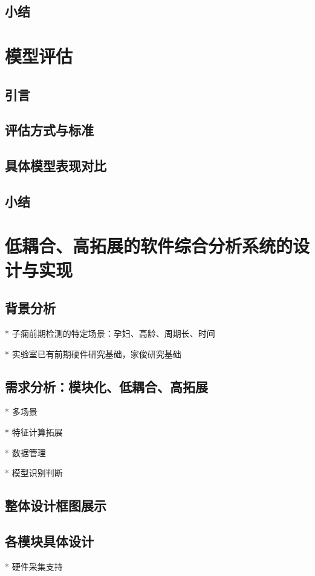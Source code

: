 \section{小结}

\chapter{模型评估}
\section{引言}
\section{评估方式与标准}
\section{具体模型表现对比}
\section{小结}

\chapter{低耦合、高拓展的软件综合分析系统的设计与实现}
\section{背景分析}
* 子痫前期检测的特定场景：孕妇、高龄、周期长、时间

* 实验室已有前期硬件研究基础，家俊研究基础

\section{需求分析：模块化、低耦合、高拓展}
* 多场景

* 特征计算拓展

* 数据管理

* 模型识别判断

\section{整体设计框图展示}

\section{各模块具体设计}
* 硬件采集支持

